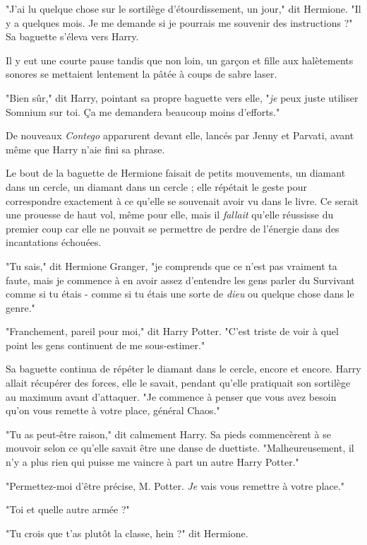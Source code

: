 "J'ai lu quelque chose sur le sortilège d'étourdissement, un jour," dit Hermione. "Il y a quelques mois. Je me demande si je pourrais me souvenir des instructions ?" Sa baguette s'éleva vers Harry.

Il y eut une courte pause tandis que non loin, un garçon et fille aux halètements sonores se mettaient lentement la pâtée à coups de sabre laser.

"Bien sûr," dit Harry, pointant sa propre baguette vers elle, "\emph{je}  peux juste utiliser Somnium sur toi. Ça me demandera beaucoup moins d'efforts."

De nouveaux \emph{Contego}  apparurent devant elle, lancés par Jenny et Parvati, avant même que Harry n'aie fini sa phrase.

Le bout de la baguette de Hermione faisait de petits mouvements, un diamant dans un cercle, un diamant dans un cercle ; elle répétait le geste pour correspondre exactement à ce qu'elle se souvenait avoir vu dans le livre. Ce serait une prouesse de haut vol, même pour elle, mais il \emph{fallait}  qu'elle réussisse du premier coup car elle ne pouvait se permettre de perdre de l'énergie dans des incantations échouées.

"Tu sais," dit Hermione Granger, "je comprends que ce n'est pas vraiment ta faute, mais je commence à en avoir assez d'entendre les gens parler du Survivant comme si tu étais - comme si tu étais une sorte de \emph{dieu}  ou quelque chose dans le genre."

"Franchement, pareil pour moi," dit Harry Potter. "C'est triste de voir à quel point les gens continuent de me sous-estimer."

Sa baguette continua de répéter le diamant dans le cercle, encore et encore. Harry allait récupérer des forces, elle le savait, pendant qu'elle pratiquait son sortilège au maximum avant d'attaquer. "Je commence à penser que vous avez besoin qu'on vous remette à votre place, général Chaos."

"Tu as peut-être raison," dit calmement Harry. Sa pieds commencèrent à se mouvoir selon ce qu'elle savait être une danse de duettiste. "Malheureusement, il n'y a plus rien qui puisse me vaincre à part un autre Harry Potter."

"Permettez-moi d'être précise, M. Potter. \emph{Je}  vais vous remettre à votre place."

"Toi et quelle autre armée ?"

"Tu crois que t'as plutôt la classe, hein ?" dit Hermione.

